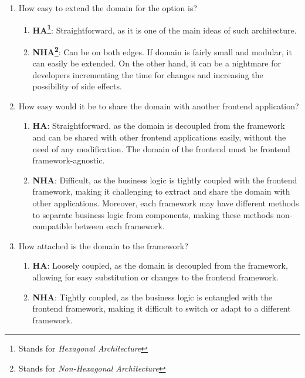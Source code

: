 \documentclass[../design.tex]{subfiles}
\begin{document}
\begin{enumerate}
	\item How easy to extend the domain for the option is?
	      \begin{enumerate}[label = -]
		      \item\textbf{HA\footnote{Stands for \emph{Hexagonal
					      Architecture}}}: Straightforward, as it is one of the main ideas
		      of such architecture.
		      \item\textbf{NHA\footnote{Stands for \emph{Non-Hexagonal
					      Architecture}}}: Can be on both edges. If domain is
		      fairly small and modular, it can easily be extended. On the other
		      hand, it can be a nightmare for developers incrementing the time
		      for changes and increasing the possibility of side effects.
	      \end{enumerate}
	\item How easy would it be to share the domain with another frontend
	      application?
	      \begin{enumerate}[label=-]
		      \item \textbf{HA}: Straightforward, as the domain is decoupled from the
		            framework and can be shared with other frontend applications
		            easily, without the need of any modification. The domain of
		            the frontend must be frontend framework-agnostic.
		      \item \textbf{NHA}: Difficult, as the business logic is tightly coupled
		            with the frontend framework, making it challenging to extract and
		            share the domain with other applications. Moreover, each
		            framework may have different methods to separate business
		            logic from components, making these methods non-compatible
		            between each framework.
	      \end{enumerate}
	\item How attached is the domain to the framework?
	      \begin{enumerate}[label=-]
		      \item \textbf{HA}: Loosely coupled, as the domain is decoupled from the
		            framework, allowing for easy substitution or changes to the
		            frontend framework.
		      \item \textbf{NHA}: Tightly coupled, as the business logic is entangled
		            with the frontend framework, making it difficult to switch or adapt
		            to a different framework.
	      \end{enumerate}

\end{enumerate}
\end{document}
